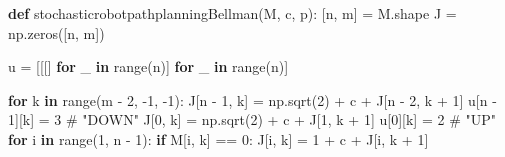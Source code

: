 \documentclass[
]{article}
\newenvironment{Shaded}{\begin{snugshade}}{\end{snugshade}}
\newcommand{\BuiltInTok}[1]{\textcolor[rgb]{0.00,0.23,0.31}{#1}}
\newcommand{\CommentTok}[1]{\textcolor[rgb]{0.37,0.37,0.37}{#1}}
\newcommand{\ControlFlowTok}[1]{\textcolor[rgb]{0.00,0.23,0.31}{\textbf{#1}}}
\newcommand{\DecValTok}[1]{\textcolor[rgb]{0.68,0.00,0.00}{#1}}
\newcommand{\KeywordTok}[1]{\textcolor[rgb]{0.00,0.23,0.31}{\textbf{#1}}}
\newcommand{\NormalTok}[1]{\textcolor[rgb]{0.00,0.23,0.31}{#1}}
\newcommand{\OperatorTok}[1]{\textcolor[rgb]{0.37,0.37,0.37}{#1}}
\begin{document}
\begin{Shaded}
\begin{Highlighting}[]
\KeywordTok{def}\NormalTok{ stochasticrobotpathplanningBellman(M, c, p):}
\NormalTok{    [n, m] }\OperatorTok{=}\NormalTok{ M.shape}
\NormalTok{    J }\OperatorTok{=}\NormalTok{ np.zeros([n, m])}

\NormalTok{    u }\OperatorTok{=}\NormalTok{ [[[] }\ControlFlowTok{for}\NormalTok{ \_ }\KeywordTok{in} \BuiltInTok{range}\NormalTok{(n)] }\ControlFlowTok{for}\NormalTok{ \_ }\KeywordTok{in} \BuiltInTok{range}\NormalTok{(n)]}

    \ControlFlowTok{for}\NormalTok{ k }\KeywordTok{in} \BuiltInTok{range}\NormalTok{(m }\OperatorTok{{-}} \DecValTok{2}\NormalTok{, }\OperatorTok{{-}}\DecValTok{1}\NormalTok{, }\OperatorTok{{-}}\DecValTok{1}\NormalTok{):}
\NormalTok{        J[n }\OperatorTok{{-}} \DecValTok{1}\NormalTok{, k] }\OperatorTok{=}\NormalTok{ np.sqrt(}\DecValTok{2}\NormalTok{) }\OperatorTok{+}\NormalTok{ c }\OperatorTok{+}\NormalTok{ J[n }\OperatorTok{{-}} \DecValTok{2}\NormalTok{, k }\OperatorTok{+} \DecValTok{1}\NormalTok{]}
\NormalTok{        u[n }\OperatorTok{{-}} \DecValTok{1}\NormalTok{][k] }\OperatorTok{=} \DecValTok{3}       \CommentTok{\# "DOWN"}
\NormalTok{        J[}\DecValTok{0}\NormalTok{, k] }\OperatorTok{=}\NormalTok{ np.sqrt(}\DecValTok{2}\NormalTok{) }\OperatorTok{+}\NormalTok{ c }\OperatorTok{+}\NormalTok{ J[}\DecValTok{1}\NormalTok{, k }\OperatorTok{+} \DecValTok{1}\NormalTok{]}
\NormalTok{        u[}\DecValTok{0}\NormalTok{][k] }\OperatorTok{=} \DecValTok{2}           \CommentTok{\# "UP"}
        \ControlFlowTok{for}\NormalTok{ i }\KeywordTok{in} \BuiltInTok{range}\NormalTok{(}\DecValTok{1}\NormalTok{, n }\OperatorTok{{-}} \DecValTok{1}\NormalTok{):}
            \ControlFlowTok{if}\NormalTok{ M[i, k] }\OperatorTok{==} \DecValTok{0}\NormalTok{:}
\NormalTok{                J[i, k] }\OperatorTok{=} \DecValTok{1} \OperatorTok{+}\NormalTok{ c }\OperatorTok{+}\NormalTok{ J[i, k }\OperatorTok{+} \DecValTok{1}\NormalTok{]}


\end{Highlighting}
\end{Shaded}
\end{document}

